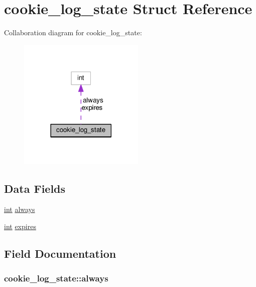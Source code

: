 \hypertarget{structcookie__log__state}{}\section{cookie\+\_\+log\+\_\+state Struct Reference}
\label{structcookie__log__state}


Collaboration diagram for cookie\+\_\+log\+\_\+state\+:
\nopagebreak
\begin{figure}[H]
\begin{center}
\leavevmode
\includegraphics[width=170pt]{structcookie__log__state__coll__graph}
\end{center}
\end{figure}
\subsection*{Data Fields}
\begin{DoxyCompactItemize}
\item 
\hyperlink{pcre_8txt_a42dfa4ff673c82d8efe7144098fbc198}{int} \hyperlink{structcookie__log__state_a1b927d0eafede5e4dcea180f84c0254f}{always}
\item 
\hyperlink{pcre_8txt_a42dfa4ff673c82d8efe7144098fbc198}{int} \hyperlink{structcookie__log__state_aa88e73d6f724fa7a5dc61c1b729b3df1}{expires}
\end{DoxyCompactItemize}


\subsection{Field Documentation}
\subsubsection[{\texorpdfstring{always}{always}}]{ cookie\+\_\+log\+\_\+state\+::always}\hypertarget{structcookie__log__state_a1b927d0eafede5e4dcea180f84c0254f}{}\label{structcookie__log__state_a1b927d0eafede5e4dcea180f84c0254f}
